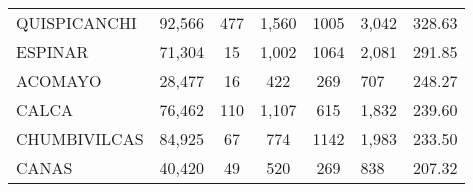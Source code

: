 \begin{tabular}{lrccclr}
		\cellcolor[HTML]{FFE699}QUISPICANCHI                           & 92,566                                                         & 477                                                         & 1,560                & 1005                     & 3,042                                                               & 328.63                                                                       \\
		\cellcolor[HTML]{FFE699}ESPINAR                                & 71,304                                                         & 15                                                          & 1,002                & 1064                     & 2,081                                                               & 291.85                                                                       \\
		\cellcolor[HTML]{FFE699}ACOMAYO                                & 28,477                                                         & 16                                                          & 422                  & 269                      & 707                                                                 & 248.27                                                                       \\
		\cellcolor[HTML]{FFE699}CALCA                                  & 76,462                                                         & 110                                                         & 1,107                & 615                      & 1,832                                                               & 239.60                                                                       \\
		\cellcolor[HTML]{FFE699}CHUMBIVILCAS                           & 84,925                                                         & 67                                                          & 774                  & 1142                     & 1,983                                                               & 233.50                                                                       \\
		\cellcolor[HTML]{C6E0B4}CANAS                                  & 40,420                                                         & 49                                                          & 520                  & 269                      & 838                                                                 & 207.32                                                                       \\

\end{tabular}
